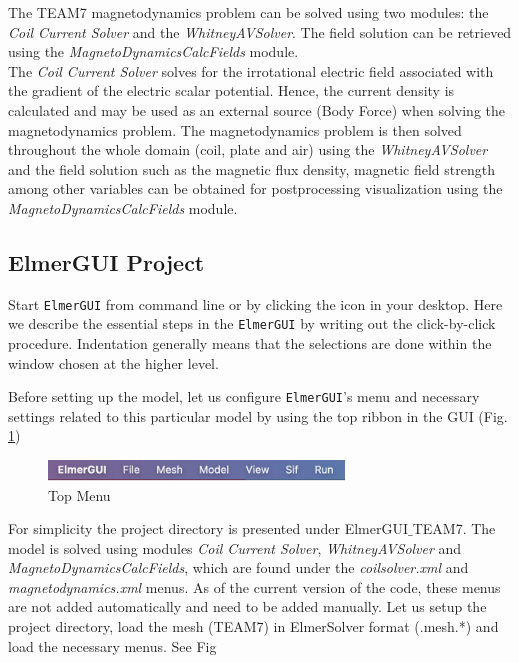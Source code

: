 The TEAM7 magnetodynamics problem can be solved using two modules: the \textit{Coil Current Solver} and the \textit{WhitneyAVSolver}.  The field solution can be retrieved using the \textit{MagnetoDynamicsCalcFields} module.\\

The \textit{Coil Current Solver} solves for the irrotational electric field associated with the gradient of the electric scalar potential.  Hence,  the current density is calculated and may be used as an external source (Body Force) when solving the magnetodynamics problem.  The magnetodynamics problem is then solved throughout the whole domain (coil,  plate and air) using the  \textit{WhitneyAVSolver} and the field solution such as the magnetic flux density,  magnetic field strength among other variables can be obtained for postprocessing visualization using the \textit{MagnetoDynamicsCalcFields} module.



\subsection*{ElmerGUI Project}

Start \texttt{ElmerGUI} from command line or by clicking the icon in your desktop. Here we describe the essential steps in the \texttt{ElmerGUI} by writing out the click-by-click procedure.  Indentation generally means that the selections are done within the window chosen at the higher level. 

Before setting up the model,  let us configure \texttt{ElmerGUI}'s menu and necessary settings related to this particular model by using the top ribbon in the GUI (Fig. \ref{fg:ribbon})

\begin{figure}[H]
\centering
\includegraphics[width=0.7\textwidth]{figures/ribbon.png}
\caption{Top Menu}\label{fg:ribbon}
\end{figure}  

For simplicity the project directory is presented under ElmerGUI$\_$TEAM7. The model is solved using modules \textit{Coil Current Solver}, \textit{WhitneyAVSolver} and \textit{MagnetoDynamicsCalcFields},  which are found under the \textit{coilsolver.xml} and \textit{magnetodynamics.xml} menus.  As of the current version of the code,  these menus are not added automatically and need to be added manually.   Let us setup the project directory,  load the mesh (TEAM7) in ElmerSolver format (.mesh.*) and load the necessary menus.  See Fig 



